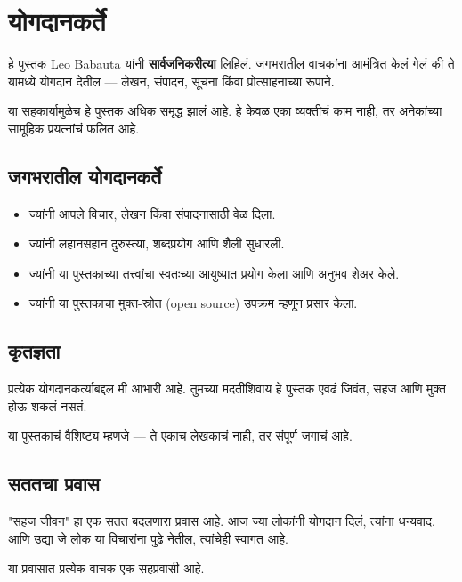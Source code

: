 \chapter{योगदानकर्ते}

हे पुस्तक Leo Babauta यांनी \textbf{सार्वजनिकरीत्या} लिहिलं.  
जगभरातील वाचकांना आमंत्रित केलं गेलं की ते यामध्ये योगदान देतील —  
लेखन, संपादन, सूचना किंवा प्रोत्साहनाच्या रूपाने.  

या सहकार्यामुळेच हे पुस्तक अधिक समृद्ध झालं आहे.  
हे केवळ एका व्यक्तीचं काम नाही, तर अनेकांच्या सामूहिक प्रयत्नांचं फलित आहे.  

\section*{जगभरातील योगदानकर्ते}

\begin{itemize}
  \item ज्यांनी आपले विचार, लेखन किंवा संपादनासाठी वेळ दिला.  
  \item ज्यांनी लहानसहान दुरुस्त्या, शब्दप्रयोग आणि शैली सुधारली.  
  \item ज्यांनी या पुस्तकाच्या तत्त्वांचा स्वतःच्या आयुष्यात प्रयोग केला आणि अनुभव शेअर केले.  
  \item ज्यांनी या पुस्तकाचा मुक्त-स्रोत (open source) उपक्रम म्हणून प्रसार केला.  
\end{itemize}

\section*{कृतज्ञता}

प्रत्येक योगदानकर्त्याबद्दल मी आभारी आहे.  
तुमच्या मदतीशिवाय हे पुस्तक एवढं जिवंत, सहज आणि मुक्त होऊ शकलं नसतं.  

या पुस्तकाचं वैशिष्ट्य म्हणजे —  
ते एकाच लेखकाचं नाही, तर संपूर्ण जगाचं आहे.  

\section*{सततचा प्रवास}

"सहज जीवन" हा एक सतत बदलणारा प्रवास आहे.  
आज ज्या लोकांनी योगदान दिलं, त्यांना धन्यवाद.  
आणि उद्या जे लोक या विचारांना पुढे नेतील, त्यांचेही स्वागत आहे.  

या प्रवासात प्रत्येक वाचक एक सहप्रवासी आहे.  
